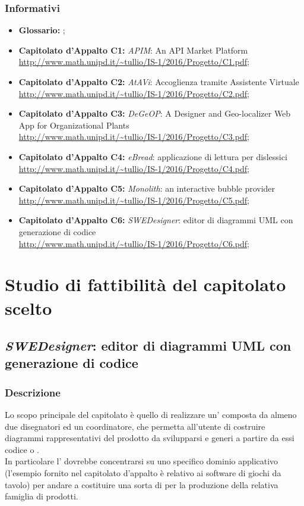 		\subsubsection{Informativi}
		\begin{itemize}
			\item \textbf{Glossario: }\emph{\Glossario};
			\item \textbf{Capitolato d'Appalto C1:} \emph{APIM}: An API Market Platform
			\\ \url{http://www.math.unipd.it/~tullio/IS-1/2016/Progetto/C1.pdf};
			\item \textbf{Capitolato d'Appalto C2:} \emph{AtAVi}: Accoglienza tramite Assistente Virtuale
			\\ \url{http://www.math.unipd.it/~tullio/IS-1/2016/Progetto/C2.pdf};
			\item \textbf{Capitolato d'Appalto C3:} \emph{DeGeOP}: A Designer and Geo-localizer Web App for Organizational Plants
			\\ \url{http://www.math.unipd.it/~tullio/IS-1/2016/Progetto/C3.pdf};
			\item \textbf{Capitolato d'Appalto C4:} \emph{eBread}: applicazione di lettura per dislessici
			\\ \url{http://www.math.unipd.it/~tullio/IS-1/2016/Progetto/C4.pdf};
			\item \textbf{Capitolato d'Appalto C5:} \emph{Monolith}: an interactive bubble provider
			\\ \url{http://www.math.unipd.it/~tullio/IS-1/2016/Progetto/C5.pdf};
			\item \textbf{Capitolato d'Appalto C6:} \emph{SWEDesigner}: editor di diagrammi UML con generazione di codice
			\\ \url{http://www.math.unipd.it/~tullio/IS-1/2016/Progetto/C6.pdf};
		\end{itemize}
\newpage
	
\section{Studio di fattibilità del capitolato scelto}
	\subsection{\emph{SWEDesigner}: editor di diagrammi UML con generazione di codice}
		\subsubsection{Descrizione}
		Lo scopo principale del capitolato è quello di realizzare un' composta da almeno due disegnatori
		ed un coordinatore, che permetta all'utente di costruire diagrammi  rappresentativi del prodotto da svilupparsi e generi a partire da essi codice 
		 o .
		\\In particolare l' dovrebbe concentrarsi su uno specifico dominio applicativo (l'esempio fornito nel capitolato d'appalto è relativo ai software 
		di giochi da tavolo) per andare a costituire una sorta di  per la produzione della relativa famiglia di prodotti.
		
